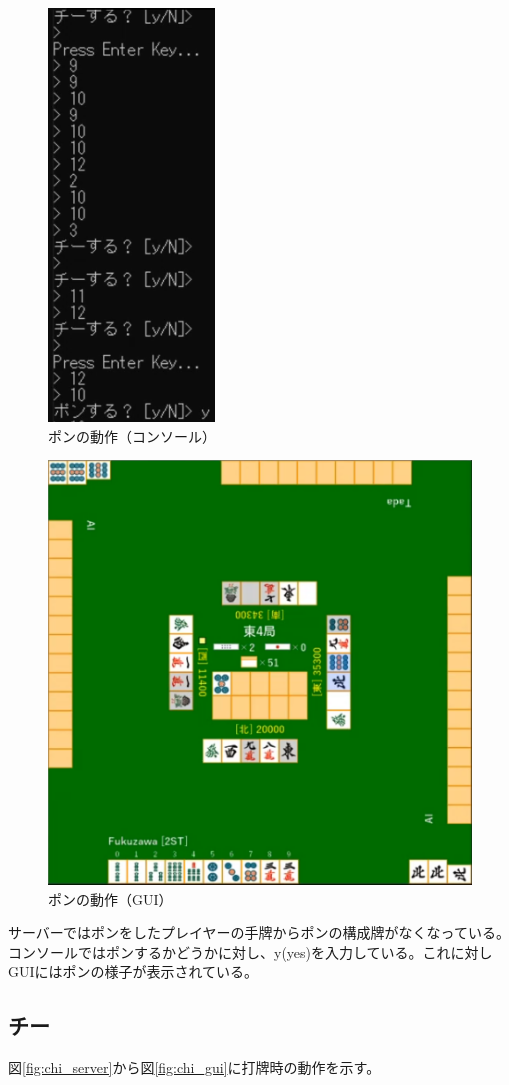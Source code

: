 \documentclass[a4j,titlepage]{jsarticle}
\begin{document}
\begin{figure}[htbp]
  \centering
  \includegraphics[width = 0.2\linewidth]{images/pon_console.png}
  \caption{ポンの動作（コンソール）}
  \label{fig:pon_console}
\end{figure}

\begin{figure}[htbp]
  \centering
  \includegraphics[width = 0.8\linewidth]{images/pon_gui.png}
  \caption{ポンの動作（GUI）}
  \label{fig:pon_gui}
\end{figure}

サーバーではポンをしたプレイヤーの手牌からポンの構成牌がなくなっている。コンソールではポンするかどうかに対し、y(yes)を入力している。これに対しGUIにはポンの様子が表示されている。

\subsection{チー}
図\ref{fig:chi_server}から図\ref{fig:chi_gui}に打牌時の動作を示す。
\end{document}
